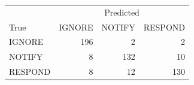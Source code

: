 \begin{tabular}{lrrr}
\toprule
 & \multicolumn{3}{c}{Predicted} \\
True & IGNORE & NOTIFY & RESPOND \\
\midrule
IGNORE & 196 & 2 & 2 \\
NOTIFY & 8 & 132 & 10 \\
RESPOND & 8 & 12 & 130 \\
\bottomrule
\end{tabular}
